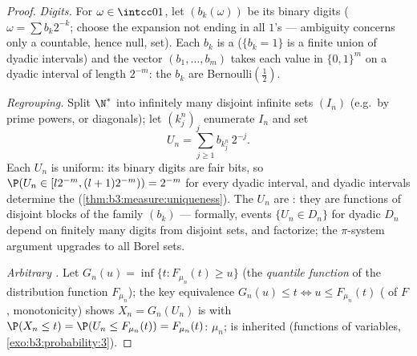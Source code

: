 \begin{proof}
\emph{Digits.} For $\omega \in \intcc01$, let $(b_k(\omega))$
be its binary digits ($\omega = \sum b_k2^{-k}$; choose the
expansion not ending in all $1$'s --- ambiguity concerns only
a countable, hence null, set). Each $b_k$ is a  ($\{b_k = 1\}$ is a finite union of dyadic
intervals) and the vector $(b_1, \dots, b_m)$ takes each
value in $\{0,1\}^m$ on a dyadic interval of length $2^{-m}$:
the $b_k$ are  Bernoulli$(\frac12)$.

\emph{Regrouping.} Split $\N^*$ into infinitely many disjoint
infinite sets $(I_n)$ (e.g.\ by prime powers, or diagonals);
let $(k^n_j)_j$ enumerate $I_n$ and set
\[
U_n = \sum_{j\geq1} b_{k^n_j}\,2^{-j} .
\]
Each $U_n$ is uniform: its binary digits are  fair
bits, so $\P(U_n \in [l2^{-m}, (l+1)2^{-m})) = 2^{-m}$ for
every dyadic interval, and dyadic intervals determine the 
(\cref{thm:b3:measure:uniqueness}). The $U_n$ are :
they are functions of disjoint blocks of the 
family $(b_k)$ --- formally, events $\{U_n \in D_n\}$ for
dyadic $D_n$ depend on finitely many digits from disjoint
sets, and factorize; the $\pi$-system argument upgrades to
all Borel sets.

\emph{Arbitrary .} Let $G_n(u) = \inf\{t : F_{\mu_n}(t)
\geq u\}$ (the \emph{quantile function} of the distribution
function $F_{\mu_n}$); the key equivalence $G_n(u) \leq t
\iff u \leq F_{\mu_n}(t)$ ( of $F$,
monotonicity) shows $X_n = G_n(U_n)$ is  with
$\P(X_n \leq t) = \P(U_n \leq F_{\mu_n}(t)) =
F_{\mu_n}(t)$:  $\mu_n$;  is inherited
(functions of  variables,
\cref{exo:b3:probability:3}).
\end{proof}

